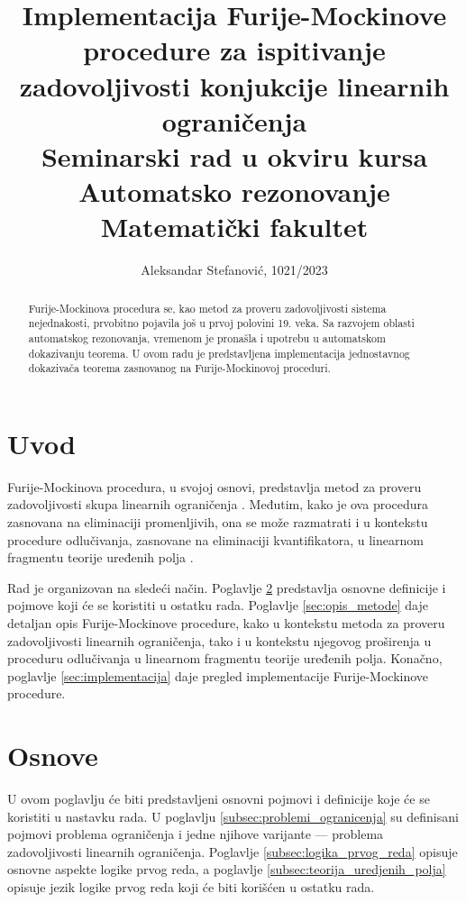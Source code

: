 \documentclass[a4paper,10pt]{article}
\title{Implementacija Furije-Mockinove procedure za ispitivanje zadovoljivosti konjukcije linearnih ograničenja\\ \small{Seminarski rad u okviru kursa\\Automatsko rezonovanje\\Matematički fakultet}}
\author{Aleksandar Stefanović, 1021/2023}
\begin{document}
\maketitle

\begin{abstract}

Furije-Mockinova procedura se, kao metod za proveru zadovoljivosti sistema nejednakosti, prvobitno pojavila još u prvoj polovini 19. veka. Sa razvojem oblasti automatskog rezonovanja, vremenom je pronašla i upotrebu u automatskom dokazivanju teorema. U ovom radu je predstavljena implementacija jednostavnog dokazivača teorema zasnovanog na Furije-Mockinovoj proceduri.

\end{abstract}

\tableofcontents

\newpage

\section{Uvod}

Furije-Mockinova procedura, u svojoj osnovi, predstavlja metod za proveru zadovoljivosti skupa linearnih ograničenja \cite{theory_of_linear_and_integer_programming}. Međutim, kako je ova procedura zasnovana na eliminaciji promenljivih, ona se može razmatrati i u kontekstu procedure odlučivanja, zasnovane na eliminaciji kvantifikatora, u linearnom fragmentu teorije uređenih polja \cite{quantifier_elimination_fourier_motzkin}.

Rad je organizovan na sledeći način. Poglavlje \ref{sec:osnove} predstavlja osnovne definicije i pojmove koji će se koristiti u ostatku rada. Poglavlje \ref{sec:opis_metode} daje detaljan opis Furije-Mockinove procedure, kako u kontekstu metoda za proveru zadovoljivosti linearnih ograničenja, tako i u kontekstu njegovog proširenja u proceduru odlučivanja u linearnom fragmentu teorije uređenih polja. Konačno, poglavlje \ref{sec:implementacija} daje pregled implementacije Furije-Mockinove procedure.

\section{Osnove}
\label{sec:osnove}

U ovom poglavlju će biti predstavljeni osnovni pojmovi i definicije koje će se koristiti u nastavku rada. U poglavlju \ref{subsec:problemi_ogranicenja} su definisani pojmovi problema ograničenja i jedne njihove varijante --- problema zadovoljivosti linearnih ograničenja. Poglavlje \ref{subsec:logika_prvog_reda} opisuje osnovne aspekte logike prvog reda, a poglavlje \ref{subsec:teorija_uredjenih_polja} opisuje jezik logike prvog reda koji će biti korišćen u ostatku rada.
\end{document}
